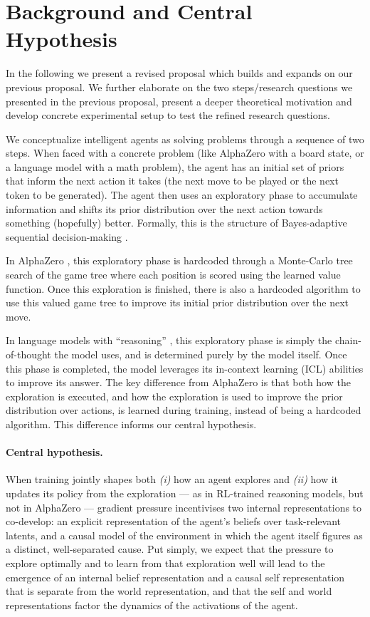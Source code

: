 \documentclass[11pt]{article}
\begin{document}
\section*{Background and Central Hypothesis}

In the following we present a revised proposal which builds and expands on our previous proposal. We further elaborate on the two steps/research questions we presented in the previous proposal, present a deeper theoretical motivation and develop concrete experimental setup to test the refined research questions. 

We conceptualize intelligent agents as solving problems through a sequence of two steps. When faced with a concrete problem (like AlphaZero with a board state, or a language model with a math problem), the agent has an initial set of priors that inform the next action it takes (the next move to be played or the next token to be generated). The agent then uses an exploratory phase to accumulate information and shifts its prior distribution over the next action towards something (hopefully) better. Formally, this is the structure of Bayes-adaptive sequential decision-making \citep{duff2002,ghavamzadeh2015}.

In AlphaZero \citep{silver2018alphazero}, this exploratory phase is hardcoded through a Monte-Carlo tree search of the game tree where each position is scored using the learned value function. Once this exploration is finished, there is also a hardcoded algorithm to use this valued game tree to improve its initial prior distribution over the next move.

In language models with ``reasoning'' \citep{deepseek2025r1}, this exploratory phase is simply the chain-of-thought the model uses, and is determined purely by the model itself. Once this phase is completed, the model leverages its in-context learning (ICL) abilities \citep{brown2020gpt3,xie2022icl} to improve its answer. The key difference from AlphaZero is that both how the exploration is executed, and how the exploration is used to improve the prior distribution over actions, is learned during training, instead of being a hardcoded algorithm. This difference informs our central hypothesis.

\paragraph{Central hypothesis.} When training jointly shapes both \emph{(i)} how an agent explores and \emph{(ii)} how it updates its policy from the exploration --- as in RL-trained reasoning models, but not in AlphaZero --- gradient pressure incentivises two internal representations to co-develop: an explicit representation of the agent's beliefs over task-relevant latents, and a causal model of the environment in which the agent itself figures as a distinct, well-separated cause. Put simply, we expect  that the pressure to explore optimally and to learn from that exploration well will lead to the emergence of an internal belief representation and a causal self representation that is separate from the world representation, and that the self and world representations factor the dynamics of the activations of the agent.
\end{document}
